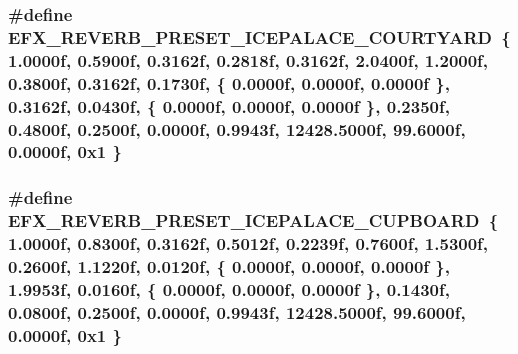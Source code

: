 \subsubsection[{\texorpdfstring{E\+F\+X\+\_\+\+R\+E\+V\+E\+R\+B\+\_\+\+P\+R\+E\+S\+E\+T\+\_\+\+I\+C\+E\+P\+A\+L\+A\+C\+E\+\_\+\+C\+O\+U\+R\+T\+Y\+A\+RD}{EFX_REVERB_PRESET_ICEPALACE_COURTYARD}}]{\setlength{\rightskip}{0pt plus 5cm}\#define E\+F\+X\+\_\+\+R\+E\+V\+E\+R\+B\+\_\+\+P\+R\+E\+S\+E\+T\+\_\+\+I\+C\+E\+P\+A\+L\+A\+C\+E\+\_\+\+C\+O\+U\+R\+T\+Y\+A\+RD~\{ 1.\+0000f, 0.\+5900f, 0.\+3162f, 0.\+2818f, 0.\+3162f, 2.\+0400f, 1.\+2000f, 0.\+3800f, 0.\+3162f, 0.\+1730f, \{ 0.\+0000f, 0.\+0000f, 0.\+0000f \}, 0.\+3162f, 0.\+0430f, \{ 0.\+0000f, 0.\+0000f, 0.\+0000f \}, 0.\+2350f, 0.\+4800f, 0.\+2500f, 0.\+0000f, 0.\+9943f, 12428.\+5000f, 99.\+6000f, 0.\+0000f, 0x1 \}}\hypertarget{efx-presets_8h_a4f06e2e425b3cefc3300fdef1100a739}{}\label{efx-presets_8h_a4f06e2e425b3cefc3300fdef1100a739}
\subsubsection[{\texorpdfstring{E\+F\+X\+\_\+\+R\+E\+V\+E\+R\+B\+\_\+\+P\+R\+E\+S\+E\+T\+\_\+\+I\+C\+E\+P\+A\+L\+A\+C\+E\+\_\+\+C\+U\+P\+B\+O\+A\+RD}{EFX_REVERB_PRESET_ICEPALACE_CUPBOARD}}]{\setlength{\rightskip}{0pt plus 5cm}\#define E\+F\+X\+\_\+\+R\+E\+V\+E\+R\+B\+\_\+\+P\+R\+E\+S\+E\+T\+\_\+\+I\+C\+E\+P\+A\+L\+A\+C\+E\+\_\+\+C\+U\+P\+B\+O\+A\+RD~\{ 1.\+0000f, 0.\+8300f, 0.\+3162f, 0.\+5012f, 0.\+2239f, 0.\+7600f, 1.\+5300f, 0.\+2600f, 1.\+1220f, 0.\+0120f, \{ 0.\+0000f, 0.\+0000f, 0.\+0000f \}, 1.\+9953f, 0.\+0160f, \{ 0.\+0000f, 0.\+0000f, 0.\+0000f \}, 0.\+1430f, 0.\+0800f, 0.\+2500f, 0.\+0000f, 0.\+9943f, 12428.\+5000f, 99.\+6000f, 0.\+0000f, 0x1 \}}\hypertarget{efx-presets_8h_a8d2347d94396aaab88765c1129f51e19}{}\label{efx-presets_8h_a8d2347d94396aaab88765c1129f51e19}
